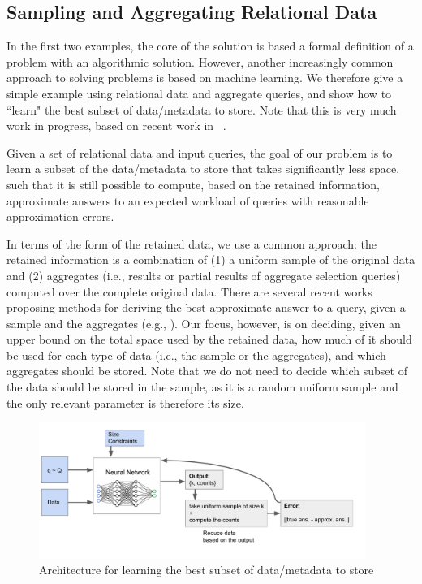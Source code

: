 \documentclass[11pt,dvipdfm]{article}
\begin{document}
\subsection{Sampling and Aggregating Relational Data}
\label{ssec: reldata}

In the first two examples, the core of the solution is based a formal definition of a problem with an algorithmic solution.  However, another increasingly common approach to solving problems is based on machine learning.  We therefore give a simple example using relational data and aggregate queries, and show how to ``learn" the best subset of data/metadata to store. Note that this is very much work in progress, based on recent work in ~\cite{Mosaic,EntropyDB,Themis}.

Given a set of relational data and  input queries, the goal of our problem is to learn a subset of the data/metadata to store that takes significantly less space, such that it is still possible to compute, based on the retained information, approximate answers to an expected workload of queries with reasonable approximation errors.

In terms of the form of the retained data, we use a common approach: the retained information is a combination of (1) a uniform sample of the original data and (2) aggregates (i.e., results or partial results of aggregate selection queries) computed over the complete original data.
There are several recent works proposing methods for deriving the best approximate answer to a query, given a sample and the aggregates (e.g., \cite{Mosaic, Themis, peng2018aqp++, liang2021combining}). Our focus, however, is on deciding, given an upper bound on the total space used by the retained data, how much of it should be used for each type of data (i.e., the sample or the aggregates), and which aggregates should be stored. Note that we do not need to decide which subset of the data should be stored in the sample, as it is a random uniform sample and the only relevant parameter is therefore its size. 
\label{sec: example}
\begin{figure}
\begin{center}
\includegraphics[width=0.95\textwidth, bb = 0 0 1020 424]{figs/example_fig.pdf}
\vspace{-5mm}
\caption{Architecture for learning the best subset of data/metadata to store}
\label{fig: example}
\vspace{-8mm}
\end{center}
\end{figure}
\end{document}
